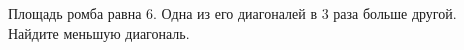\begin{ex}
	\begin{condition}
		Площадь ромба равна \( 6 \). Одна из его диагоналей в \( 3 \) раза больше другой. Найдите меньшую диагональ.
	\end{condition}
\end{ex}
